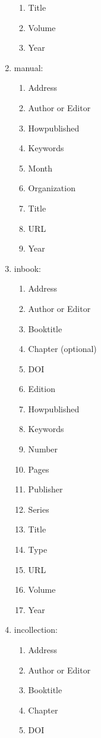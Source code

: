 \documentclass[letter,12pt]{article}
\begin{document}
\begin{enumerate}
\begin{enumerate}
	\item Title
	\item Volume
	\item Year
	\end{enumerate}
\item manual: \vspace{-0.3cm}
	\begin{enumerate} \itemsep -2pt
	\item Address
	\item Author or Editor
	\item Howpublished
	\item Keywords
	\item Month
	\item Organization
	\item Title
	\item URL
	\item Year
	\end{enumerate}
\item inbook: \vspace{-0.3cm}
	\begin{enumerate} \itemsep -2pt
	\item Address
	\item Author or Editor
	\item Booktitle
	\item Chapter (optional)
	\item DOI
	\item Edition
	\item Howpublished
	\item Keywords
	\item Number
	\item Pages
	\item Publisher
	\item Series
	\item Title
	\item Type
	\item URL
	\item Volume
	\item Year
	\end{enumerate}
\item incollection: \vspace{-0.3cm}
	\begin{enumerate} \itemsep -2pt
	\item Address
	\item Author or Editor
	\item Booktitle
	\item Chapter
	\item DOI

\end{enumerate}
\end{enumerate}
\end{document}
